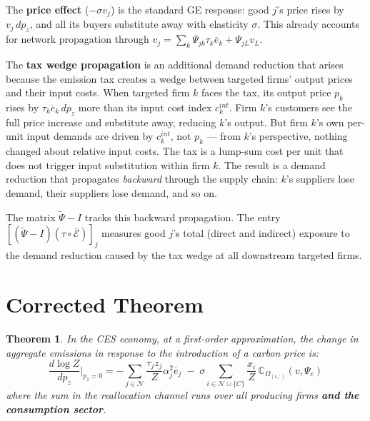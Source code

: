 \documentclass[11pt]{article}
\newtheorem{theorem}{Theorem}
\newcommand{\N}{\mathcal{N}}
\begin{document}
The \textbf{price effect} ($-\sigma v_j$) is the standard GE response: good $j$'s price rises by $v_j\,dp_z$, and all its buyers substitute away with elasticity $\sigma$. This already accounts for network propagation through $v_j = \sum_k\Psi_{jk}\tau_k\overline{e}_k + \Psi_{jL}v_L$.

The \textbf{tax wedge propagation} is an additional demand reduction that arises because the emission tax creates a wedge between targeted firms' output prices and their input costs. When targeted firm $k$ faces the tax, its output price $p_k$ rises by $\tau_k\overline{e}_k\,dp_z$ more than its input cost index $c_k^{int}$. Firm $k$'s customers see the full price increase and substitute away, reducing $k$'s output. But firm $k$'s own per-unit input demands are driven by $c_k^{int}$, not $p_k$ --- from $k$'s perspective, nothing changed about relative input costs. The tax is a lump-sum cost per unit that does not trigger input substitution within firm $k$. The result is a demand reduction that propagates \textit{backward} through the supply chain: $k$'s suppliers lose demand, their suppliers lose demand, and so on.

The matrix $\widetilde{\Psi} - I$ tracks this backward propagation. The entry $[(\widetilde{\Psi} - I)(\tau \circ \overline{\mathcal{E}})]_j$ measures good $j$'s total (direct and indirect) exposure to the demand reduction caused by the tax wedge at all downstream targeted firms.


\section{Corrected Theorem}

\begin{theorem}
\label{thm:correct2}
In the CES economy, at a first-order approximation, the change in aggregate emissions in response to the introduction of a carbon price is:
\begin{equation}
    \label{eq:correct_theorem2}
    \frac{d\log Z}{dp_z}\bigg|_{p_z=0} = -\sum_{j \in \N} \frac{\tau_j z_j}{Z}\alpha_j^2\overline{e}_j \;-\; \sigma\sum_{i \in \N \cup \{C\}} \frac{x_i}{Z}\,\mathbb{C}_{\Omega_{(i,:)}}(v, \Psi_e)
\end{equation}
where the sum in the reallocation channel runs over all producing firms \textbf{and the consumption sector}.
\end{theorem}
\end{document}
